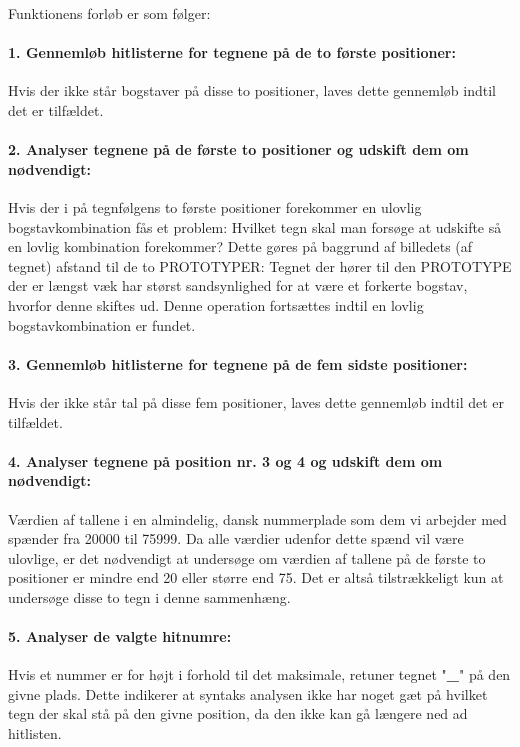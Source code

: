 Funktionens forløb er som følger:

\paragraph{1. Gennemløb hitlisterne for tegnene på de to første positioner:} Hvis der ikke står bogstaver på disse to positioner, laves dette gennemløb indtil det er tilfældet.
\paragraph{2. Analyser tegnene på de første to positioner og udskift dem om nødvendigt:}
Hvis der i på tegnfølgens to første positioner forekommer en ulovlig bogstavkombination fås et problem: Hvilket tegn skal man forsøge at udskifte så en lovlig kombination forekommer? Dette gøres på baggrund af billedets (af tegnet) afstand til de to PROTOTYPER: Tegnet der hører til den PROTOTYPE der er længst væk har størst sandsynlighed for at være et forkerte bogstav, hvorfor denne skiftes ud. Denne operation fortsættes indtil en lovlig bogstavkombination er fundet.

\paragraph{3. Gennemløb hitlisterne for tegnene på de fem sidste positioner:} Hvis der ikke står tal på disse fem positioner, laves dette gennemløb indtil det er tilfældet.

\paragraph{4. Analyser tegnene på position nr. 3 og 4 og udskift dem om nødvendigt:}
Værdien af tallene i en almindelig, dansk nummerplade som dem vi arbejder med spænder fra 20000 til 75999. Da alle værdier udenfor dette spænd vil være ulovlige, er det nødvendigt at undersøge om værdien af tallene på de første to positioner er mindre end 20 eller større end 75. Det er altså tilstrækkeligt kun at undersøge disse to tegn i denne sammenhæng.

\paragraph{5. Analyser de valgte hitnumre:} Hvis et nummer er for højt i forhold til det maksimale, retuner tegnet "\textbf{\_}" på den givne plads. Dette indikerer at syntaks analysen ikke har noget gæt på hvilket tegn der skal stå på den givne position, da den ikke kan gå længere ned ad hitlisten.

